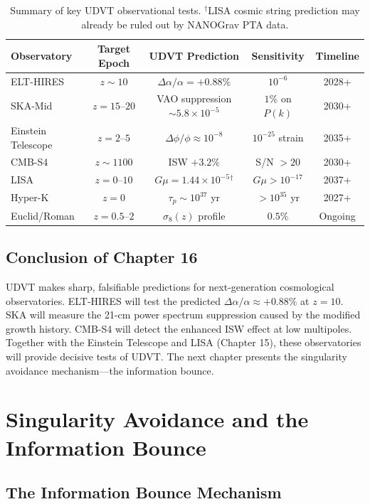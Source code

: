 \documentclass[12pt,a4paper]{book}
\theoremstyle{definition}
\theoremstyle{remark}
\begin{document}
\begin{table}[htbp]
\centering
\caption{Summary of key UDVT observational tests. $^\dagger$LISA cosmic string prediction may already be ruled out by NANOGrav PTA data.}
\begin{tabular}{@{}lcccc@{}}
\toprule
\textbf{Observatory} & \textbf{Target Epoch} & \textbf{UDVT Prediction} & \textbf{Sensitivity} & \textbf{Timeline} \\
\midrule
ELT-HIRES & $z \sim 10$ & $\Delta\alpha/\alpha = +0.88\%$ & $10^{-6}$ & 2028+ \\
SKA-Mid & $z = 15$--$20$ & VAO suppression $\sim 5.8 \times 10^{-5}$ & $1\%$ on $P(k)$ & 2030+ \\
Einstein Telescope & $z = 2$--$5$ & $\Delta\phi/\phi \approx 10^{-8}$ & $10^{-25}$ strain & 2035+ \\
CMB-S4 & $z \sim 1100$ & ISW $+3.2\%$ & S/N $> 20$ & 2030+ \\
LISA & $z = 0$--$10$ & $G\mu = 1.44 \times 10^{-5}$$^\dagger$ & $G\mu > 10^{-17}$ & 2037+ \\
Hyper-K & $z = 0$ & $\tau_p \sim 10^{37}$ yr & $> 10^{35}$ yr & 2027+ \\
Euclid/Roman & $z = 0.5$--$2$ & $\sigma_8(z)$ profile & $0.5\%$ & Ongoing \\
\bottomrule
\end{tabular}
\end{table}

\section{Conclusion of Chapter 16}

UDVT makes sharp, falsifiable predictions for next-generation cosmological observatories. ELT-HIRES will test the predicted $\Delta\alpha/\alpha \approx +0.88\%$ at $z = 10$. SKA will measure the 21-cm power spectrum suppression caused by the modified growth history. CMB-S4 will detect the enhanced ISW effect at low multipoles. Together with the Einstein Telescope and LISA (Chapter 15), these observatories will provide decisive tests of UDVT. The next chapter presents the singularity avoidance mechanism---the information bounce.

\chapter{Singularity Avoidance and the Information Bounce}
\label{ch:bounce}

\section{The Information Bounce Mechanism}
\end{document}

